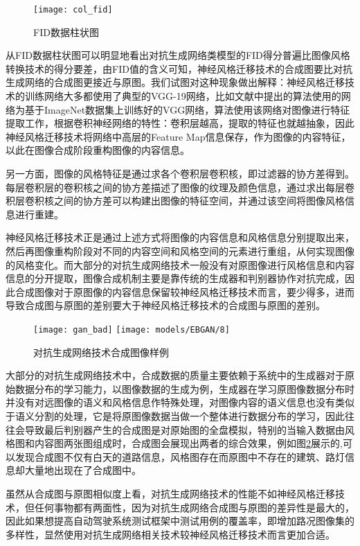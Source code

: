 \begin{figure}[h]
    \centering
    \texttt{[image: col\_fid]}
    \caption{FID数据柱状图}
    \label{col_fid}
\end{figure}

从FID数据柱状图可以明显地看出对抗生成网络类模型的FID得分普遍比图像风格转换技术的得分要差，由FID值的含义可知，神经风格迁移技术的合成图要比对抗生成网络的合成图更接近与原图。我们试图对这种现象做出解释：神经风格迁移技术的训练网络大多都使用了典型的VGG-19网络，比如文献\cite{nst}中提出的算法使用的网络为基于ImageNet数据集\cite{ImageNet}上训练好的VGG网络，算法使用该网络对图像进行特征提取工作，根据卷积神经网络的特性：卷积层越高，提取的特征也就越抽象，因此神经风格迁移技术将网络中高层的Feature Map信息保存，作为图像的内容特征，以此在图像合成阶段重构图像的内容信息。 

另一方面，图像的风格特征是通过求各个卷积层卷积核，即过滤器的协方差得到。每层卷积层的卷积核之间的协方差描述了图像的纹理及颜色信息，通过求出每层卷积层卷积核之间的协方差可以构建出图像的特征空间，并通过该空间将图像风格信息进行重建。

神经风格迁移技术正是通过上述方式将图像的内容信息和风格信息分别提取出来，然后再图像重构阶段对不同的内容空间和风格空间的元素进行重组，从何实现图像的风格变化。而大部分的对抗生成网络技术一般没有对原图像进行风格信息和内容信息的分开提取，图像合成机制主要是靠传统的生成器和判别器协作对抗完成，因此合成图像对于原图像的内容信息保留较神经风格迁移技术而言，要少得多，进而导致合成图与原图的差别要大于神经风格迁移技术的合成图与原图的差别。

\begin{figure}[h]
    \centering
    \texttt{[image: gan\_bad]}
    \texttt{[image: models/EBGAN/8]}
    \caption{对抗生成网络技术合成图像样例}
    \label{fig:gan}
\end{figure}

大部分的对抗生成网络技术中，合成数据的质量主要依赖于系统中的生成器对于原始数据分布的学习能力，以图像数据的生成为例，生成器在学习原图像数据分布时并没有对远图像的语义和风格信息作特殊处理，对图像内容的语义信息也没有类似于语义分割的处理，它是将原图像数据当做一个整体进行数据分布的学习，因此往往会导致最后判别器产生的合成图是对原始图的全盘模拟，特别的当输入数据由风格图和内容图两张图组成时，合成图会展现出两者的综合效果，例如图\ref{fig:gan}展示的,可以发现合成图不仅有白天的道路信息，风格图存在而原图中不存在的建筑、路灯信息却大量地出现在了合成图中。

虽然从合成图与原图相似度上看，对抗生成网络技术的性能不如神经风格迁移技术，但任何事物都有两面性，因为对抗生成网络合成图与原图的差异性是最大的，因此如果想提高自动驾驶系统测试框架中测试用例的覆盖率，即增加路况图像集的多样性，显然使用对抗生成网络相关技术较神经风格迁移技术而言更加合适。

